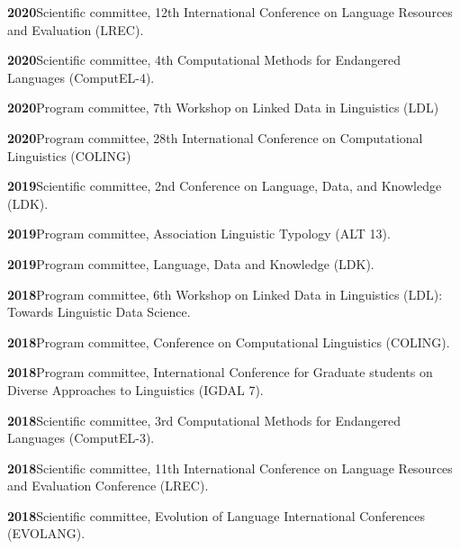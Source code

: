 \documentclass[11pt]{article}
\newcommand{\hangpara}{
 \setlength{\parindent}{0in} %
 \hangindent=0.42in %
}
\begin{document}
\vskip 6pt
\hangpara
{\bf 2020}\hspace{1ex}Scientific committee, 12th International Conference on Language Resources and Evaluation (LREC).

\vskip 6pt
\hangpara
{\bf 2020}\hspace{1ex}Scientific committee, 4th Computational Methods for Endangered Languages (ComputEL-4).

\vskip 6pt
\hangpara
{\bf 2020}\hspace{1ex}Program committee, 7th Workshop on Linked Data in Linguistics (LDL)

\vskip 6pt
\hangpara
{\bf 2020}\hspace{1ex}Program committee, 28th International Conference on Computational Linguistics (COLING)

\vskip 6pt
\hangpara
{\bf 2019}\hspace{1ex}Scientific committee, 2nd Conference on Language, Data, and Knowledge (LDK).

\vskip 6pt
\hangpara
{\bf 2019}\hspace{1ex}Program committee, Association Linguistic Typology (ALT 13).

\vskip 6pt
\hangpara
{\bf 2019}\hspace{1ex}Program committee, Language, Data and Knowledge (LDK).

\vskip 6pt
\hangpara
{\bf 2018}\hspace{1ex}Program committee, 6th Workshop on Linked Data in Linguistics (LDL): Towards Linguistic Data Science.

\vskip 6pt
\hangpara
{\bf 2018}\hspace{1ex}Program committee, Conference on Computational Linguistics (COLING).

\vskip 6pt
\hangpara
{\bf 2018}\hspace{1ex}Program committee, International Conference for Graduate students on Diverse Approaches to Linguistics (IGDAL 7).

\vskip 6pt
\hangpara
{\bf 2018}\hspace{1ex}Scientific committee, 3rd Computational Methods for Endangered Languages (ComputEL-3).

\vskip 6pt
\hangpara
{\bf 2018}\hspace{1ex}Scientific committee, 11th International Conference on Language Resources and Evaluation Conference (LREC).

\vskip 6pt
\hangpara
{\bf 2018}\hspace{1ex}Scientific committee, Evolution of Language International Conferences (EVOLANG).
\end{document}
